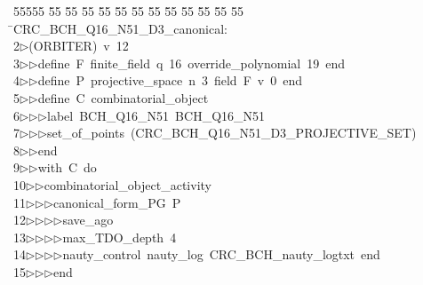 %
%
\begin{tabbing}
55555 \= 55 \= 55 \= 55 \= 55 \= 55 \= 55 \= 55 \= 55 \= 55 \= 55 \= 55 \= 55 \= \>CRC\_BCH\_Q16\_N51\_D3\_canonical:\ \\[0pt]
2\>$\triangleright$\>(ORBITER)\ v\ 12\ \\[0pt]
3\>$\triangleright$\>$\triangleright$\>define\ F\ finite\_field\ q\ 16\ override\_polynomial\ 19\ end\ \\[0pt]
4\>$\triangleright$\>$\triangleright$\>define\ P\ projective\_space\ n\ 3\ field\ F\ v\ 0\ end\ \\[0pt]
5\>$\triangleright$\>$\triangleright$\>define\ C\ combinatorial\_object\ \\[0pt]
6\>$\triangleright$\>$\triangleright$\>$\triangleright$\>label\ BCH\_Q16\_N51\ BCH\_Q16\_N51\ \\[0pt]
7\>$\triangleright$\>$\triangleright$\>$\triangleright$\>set\_of\_points\ (CRC\_BCH\_Q16\_N51\_D3\_PROJECTIVE\_SET)\ \\[0pt]
8\>$\triangleright$\>$\triangleright$\>end\ \\[0pt]
9\>$\triangleright$\>$\triangleright$\>with\ C\ do\ \\[0pt]
10\>$\triangleright$\>$\triangleright$\>combinatorial\_object\_activity\ \\[0pt]
11\>$\triangleright$\>$\triangleright$\>$\triangleright$\>canonical\_form\_PG\ P\ \\[0pt]
12\>$\triangleright$\>$\triangleright$\>$\triangleright$\>$\triangleright$\>save\_ago\ \\[0pt]
13\>$\triangleright$\>$\triangleright$\>$\triangleright$\>$\triangleright$\>max\_TDO\_depth\ 4\ \\[0pt]
14\>$\triangleright$\>$\triangleright$\>$\triangleright$\>$\triangleright$\>nauty\_control\ nauty\_log\ CRC\_BCH\_nauty\_logtxt\ end\ \\[0pt]
15\>$\triangleright$\>$\triangleright$\>$\triangleright$\>end\ \\[0pt]

\end{tabbing}
